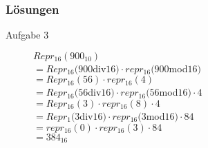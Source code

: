 \documentclass{beamer}
\begin{document}
	\begin{frame}
		\frametitle{Lösungen}
		\small
		\begin{description}
			\item[Aufgabe 3] $Repr_{16}(900_{10})$\\
				\pause
				$=Repr_{16}(900$div$16)\cdot repr_{16}(900$mod$16)$\\
				\pause
				$=Repr_{16}(56)\cdot repr_{16}(4)$\\
				\pause
				$=Repr_{16}(56$div$16)\cdot repr_{16}(56$mod$16)\cdot 4$\\
				\pause
				$=Repr_{16}(3)\cdot repr_{16}(8)\cdot 4$\\
				\pause
				$=Repr_{1}(3$div$16)\cdot repr_{16}(3$mod$16)\cdot 84$\\
				\pause
				$=repr_{16}(0)\cdot repr_{16}(3)\cdot 84$\\
				\pause
				$=384_{16}$\\
		\end{description}
	\end{frame}
\end{document}
